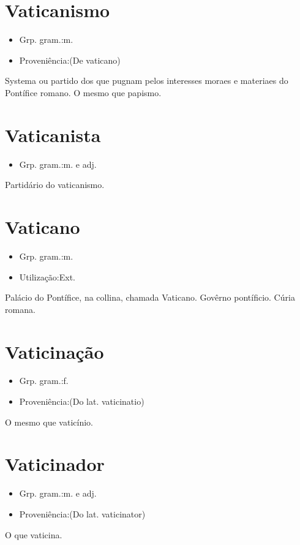 \documentclass{article}
\begin{document}
\section{Vaticanismo}
\begin{itemize}
\item {Grp. gram.:m.}
\end{itemize}
\begin{itemize}
\item {Proveniência:(De \textunderscore vaticano\textunderscore )}
\end{itemize}
Systema ou partido dos que pugnam pelos interesses moraes e materiaes do Pontífice romano.
O mesmo que \textunderscore papismo\textunderscore .
\section{Vaticanista}
\begin{itemize}
\item {Grp. gram.:m.  e  adj.}
\end{itemize}
Partidário do vaticanismo.
\section{Vaticano}
\begin{itemize}
\item {Grp. gram.:m.}
\end{itemize}
\begin{itemize}
\item {Utilização:Ext.}
\end{itemize}
Palácio do Pontífice, na collina, chamada Vaticano.
Govêrno pontíficio.
Cúria romana.
\section{Vaticinação}
\begin{itemize}
\item {Grp. gram.:f.}
\end{itemize}
\begin{itemize}
\item {Proveniência:(Do lat. \textunderscore vaticinatio\textunderscore )}
\end{itemize}
O mesmo que \textunderscore vaticínio\textunderscore .
\section{Vaticinador}
\begin{itemize}
\item {Grp. gram.:m.  e  adj.}
\end{itemize}
\begin{itemize}
\item {Proveniência:(Do lat. \textunderscore vaticinator\textunderscore )}
\end{itemize}
O que vaticina.
\end{document}
